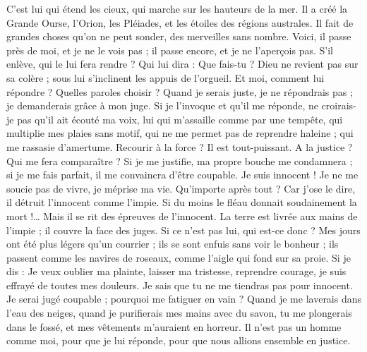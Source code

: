 \begin{multicols}{2}
 C'est lui qui étend les cieux, qui marche sur les hauteurs de la mer.
Il a créé la Grande Ourse, l'Orion, les Pléiades, et les étoiles des régions australes.
Il fait de grandes choses qu'on ne peut sonder, des merveilles sans nombre.
Voici, il passe près de moi, et je ne le vois pas ; il passe encore, et je ne l'aperçois pas.
S'il enlève, qui le lui fera rendre ? Qui lui dira : Que fais-tu ?
Dieu ne revient pas sur sa colère ; sous lui s'inclinent les appuis de l'orgueil.
Et moi, comment lui répondre ? Quelles paroles choisir ?
Quand je serais juste, je ne répondrais pas ; je demanderais grâce à mon juge.
Si je l'invoque et qu'il me réponde, ne croirais-je pas qu'il ait écouté ma voix,
lui qui m'assaille comme par une tempête, qui multiplie mes plaies sans motif,
qui ne me permet pas de reprendre haleine ; qui me rassasie d'amertume.
Recourir à la force ? Il est tout-puissant. A la justice ? Qui me fera comparaître ?
Si je me justifie, ma propre bouche me condamnera ; si je me fais parfait, il me convaincra d'être coupable.
Je suis innocent ! Je ne me soucie pas de vivre, je méprise ma vie.
Qu'importe après tout ? Car j'ose le dire, il détruit l'innocent comme l'impie.
Si du moins le fléau donnait soudainement la mort !… Mais il se rit des épreuves de l'innocent.
La terre est livrée aux mains de l'impie ; il couvre la face des juges. Si ce n'est pas lui, qui est-ce donc ?
Mes jours ont été plus légers qu'un courrier ; ils se sont enfuis sans voir le bonheur ;
ils passent comme les navires de roseaux, comme l'aigle qui fond sur sa proie.
Si je dis : Je veux oublier ma plainte, laisser ma tristesse, reprendre courage,
je suis effrayé de toutes mes douleurs. Je sais que tu ne me tiendras pas pour innocent.
Je serai jugé coupable ; pourquoi me fatiguer en vain ?
Quand je me laverais dans l'eau des neiges, quand je purifierais mes mains avec du savon,
tu me plongerais dans le fossé, et mes vêtements m'auraient en horreur.
Il n'est pas un homme comme moi, pour que je lui réponde, pour que nous allions ensemble en justice.

\end{multicols}
